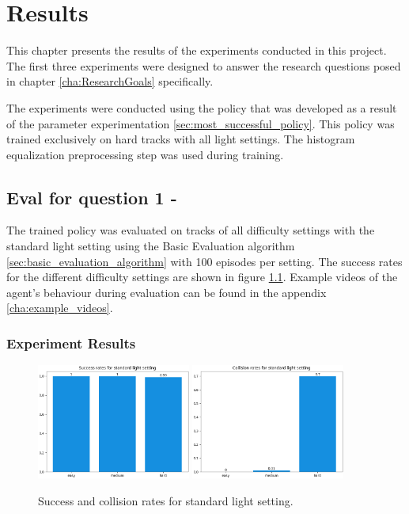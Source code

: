 \chapter{Results}
\label{cha:Results}

This chapter presents the results of the experiments conducted in this project. The first three experiments were designed to answer the research questions posed in chapter \ref{cha:ResearchGoals} specifically. 

The experiments were conducted using the policy that was developed as a result of the parameter experimentation \ref{sec:most_successful_policy}. This policy was trained exclusively on hard tracks with all light settings. The histogram equalization preprocessing step was used during training.


\section{Eval for question 1 - \questionOne}

The trained policy was evaluated on tracks of all difficulty settings with the standard light setting using the Basic Evaluation algorithm \ref{sec:basic_evaluation_algorithm} with 100 episodes per setting. The success rates for the different difficulty settings are shown in figure \ref{fig:result_success_rates_standard}. Example videos of the agent's behaviour during evaluation can be found in the appendix \ref{cha:example_videos}.

\subsection{Experiment Results}

\begin{figure}
    \centering
    \includegraphics[width=0.45\textwidth]{Bilder/notebook_images/hardDistanceMixedLight_eval_standard_success_rates_barplot.png}
    \includegraphics[width=0.45\textwidth]{Bilder/notebook_images/hardDistanceMixedLight_eval_standard_collision_rates_barplot.png}
    \caption{Success and collision rates for standard light setting.}
    \label{fig:result_success_rates_standard}
\end{figure}


